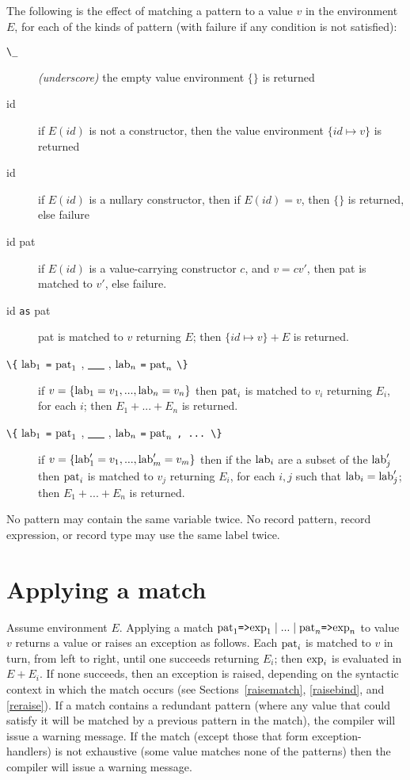 The following is the effect of matching a pattern  to a value $v$ in the
environment $E$, for
each of the kinds of pattern (with failure if any condition is not
satisfied):
\begin{description}
\item[\protect\verb"\_"\hfill]  {\it (underscore)} the empty value environment $\{\}$ is
returned
\item[id\hfill] if $E(id)$ is not a constructor, then the value environment
$\{id \mapsto v\}$ is returned
\item[id\hfill] if $E(id)$ is a nullary constructor, then if $E(id)=v$,
then $\{\}$ is returned, else failure
\item[id pat\hfill]  if $E(id)$ is a value-carrying constructor $c$, and 
$v = c v'$, then pat is matched to $v'$, else failure.
\item[id \protect\verb"as" pat\hfill]  pat is matched to $v$ returning $E$;
then $\{id \mapsto v\}+E$ is returned.
\item[\protect\verb"\{" ${\rm lab}_1$ \protect\verb"=" ${\rm pat}_1$ , \underline{\ \ \ } , ${\rm lab}_n$ \protect\verb"=" ${\rm pat}_n$ \protect\verb"\}" \hfill]  
if $v = \{ {\rm lab}_1 = v_1 , ... , {\rm lab}_n = v_n \}$ then 
${\rm pat}_i$ is matched to $v_i$ returning $E_i$, for each $i$; then 
$E_1 + ... + E_n$ is returned.

\item[\protect\verb"\{" ${\rm lab}_1$ \protect\verb"=" ${\rm pat}_1$ , \underline{\ \ \ } , ${\rm lab}_n$ \protect\verb"=" ${\rm pat}_n$ \protect\verb", ... \}" \hfill]  
if $v = \{ {\rm lab}'_1 = v_1 , ... , {\rm lab}'_m = v_m \}$ then if
the ${\rm lab}_i$ are a subset of the ${\rm lab}'_j$ then
${\rm pat}_i$ is matched to $v_j$ returning $E_i$, for each $i,j$ such that
${\rm lab}_i = {\rm lab}'_j$; then 
$E_1 + ... + E_n$ is returned.
\end{description}
No pattern may contain the same variable twice.
No record pattern, record expression, or record type may use the same
label twice.
\section{Applying a match}
Assume environment $E$.  Applying a match
$ {\rm pat}_1 \protect\verb"=>" {\rm exp}_1 \mid ... 
\mid {\rm pat}_n \protect\verb"=>" {\rm exp}_n $ to value $v$ returns a value
or raises an exception as follows.  Each ${\rm pat}_i$ is matched to
$v$ in turn, from left to right, until one succeeds returning $E_i$;
then ${\rm exp}_i$ is evaluated in $E+E_i$.  If none succeeds, then
an exception is raised, depending on the syntactic context in which
the match occurs (see Sections~\ref{raisematch}, \ref{raisebind}, and \ref{reraise}).
\label{matchwarn}
If a match contains a redundant pattern (where any value that could
satisfy it will be matched by a previous pattern in the match), the
compiler will issue a warning message.  If the match (except those
that form exception-handlers) is not exhaustive (some value matches
none of the patterns) then the compiler will issue a warning message.


